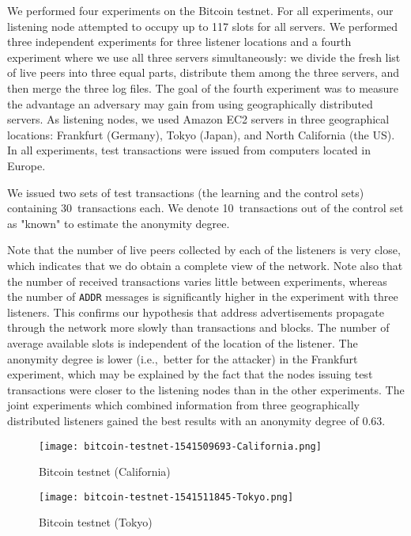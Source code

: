 We performed four experiments on the Bitcoin testnet.
For all experiments, our listening node attempted to occupy up to 117 slots for all servers.
We performed three independent experiments for three listener locations and a fourth experiment where we use all three servers simultaneously: we divide the fresh list of live peers into three equal parts, distribute them among the three servers, and then merge the three log files.
The goal of the fourth experiment was to measure the advantage an adversary may gain from using geographically distributed servers.
As listening nodes, we used Amazon EC2 servers in three geographical locations: Frankfurt (Germany), Tokyo (Japan), and North California (the US).
In all experiments, test transactions were issued from computers located in Europe.

We issued two sets of test transactions (the learning and the control sets) containing 30~transactions each.
We denote 10~transactions out of the control set as "known" to estimate the anonymity degree.

Note that the number of live peers collected by each of the listeners is very close, which indicates that we do obtain a complete view of the network.
Note also that the number of received transactions varies little between experiments, whereas the number of \texttt{ADDR} messages is significantly higher in the experiment with three listeners.
This confirms our hypothesis that address advertisements propagate through the network more slowly than transactions and blocks.
The number of average available slots is independent of the location of the listener.
The anonymity degree is lower (i.e.,~better for the attacker) in the Frankfurt experiment, which may be explained by the fact that the nodes issuing test transactions were closer to the listening nodes than in the other experiments.
The joint experiments which combined information from three geographically distributed listeners gained the best results with an anonymity degree of 0.63.

\begin{figure*}
	\centering
	\begin{minipage}{0.5\textwidth}
		\centering
		\texttt{[image: bitcoin-testnet-1541509693-California.png]}
		\caption{Bitcoin testnet (California)}
	\end{minipage}\hfill
	\begin{minipage}{0.5\textwidth}
		\centering
		\texttt{[image: bitcoin-testnet-1541511845-Tokyo.png]}
		\caption{Bitcoin testnet (Tokyo)}
	\end{minipage}\hfill
	\label{fig:bitcoin-testnet-1}
\end{figure*}

